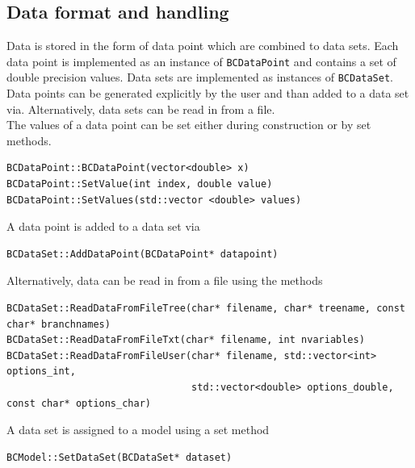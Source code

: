 \documentclass[11pt, a4paper]{article}
\begin{document}

\subsection{Data format and handling} 

Data is stored in the form of data point which are combined to data
sets. Each data point is implemented as an instance of
\verb|BCDataPoint| and contains a set of double precision values. Data
sets are implemented as instances of \verb|BCDataSet|. Data points can
be generated explicitly by the user and than added to a data set
via. Alternatively, data sets can be read in from a file. \\ 

\noindent 
The values of a data point can be set either during construction or by
set methods. 
\begin{small}
\begin{verbatim}
BCDataPoint::BCDataPoint(vector<double> x) 
BCDataPoint::SetValue(int index, double value)  
BCDataPoint::SetValues(std::vector <double> values) 
\end{verbatim} 
\end{small} 

\noindent 
A data point is added to a data set via  
\begin{small}
\begin{verbatim}
BCDataSet::AddDataPoint(BCDataPoint* datapoint)
\end{verbatim} 
\end{small} 

\noindent 
Alternatively, data can be read in from a file using the methods 
\begin{small}
\begin{verbatim}
BCDataSet::ReadDataFromFileTree(char* filename, char* treename, const char* branchnames)
BCDataSet::ReadDataFromFileTxt(char* filename, int nvariables)
BCDataSet::ReadDataFromFileUser(char* filename, std::vector<int> options_int,
                                std::vector<double> options_double, const char* options_char)
\end{verbatim} 
\end{small} 

\noindent 
A data set is assigned to a model using a set method 
\begin{small} 
\begin{verbatim}
BCModel::SetDataSet(BCDataSet* dataset)
\end{verbatim} 
\end{small} 
\end{document}

